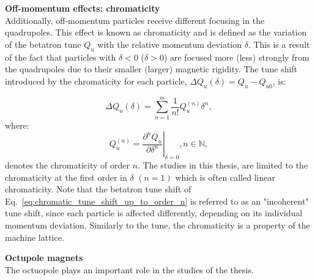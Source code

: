 

\textbf{Off-momentum effects: chromaticity}\\
Additionally, off-momentum particles receive different focusing in the quadrupoles. This effect is known as chromaticity and is defined as the variation of the betatron tune $Q_u$ with the relative momentum deviation $\delta$. This is a result of the fact that particles with $\delta < 0$ ($\delta > 0$) are focused more (less) strongly from the quadrupoles due to their smaller (larger) magnetic rigidity. The tune shift introduced by the chromaticity for each particle, $ \Delta Q_u (\delta)= Q_u - Q_{u0}$, is: %


\begin{equation}\label{eq:chromatic_tune_shift_up_to_order_n}
   \Delta Q_u (\delta) = \sum_{n=1}^m \frac{1}{n!} Q_u^{(n)} \delta^n, 
\end{equation}
where:
\begin{equation}\label{eq:chroma_up_to_order_m}
    Q_u^{(n)} = \left. \frac{\partial ^n Q_u}{\partial \delta^n} \right|_{\delta=0}, n \in \mathbb{N},
 \end{equation}
denotes the chromaticity of order $n$. The studies in this thesis, are limited to the chromaticity at the first order in $\delta$ $(n=1)$ which is often called linear chromaticity. Note that the betatron tune shift of Eq.~\eqref{eq:chromatic_tune_shift_up_to_order_n} is referred to as an "incoherent" tune shift, since each particle is affected differently, depending on its individual momentum deviation. Similarly to the tune, the chromaticity is a property of the machine lattice. %



\textbf{Octupole magnets}\\
The octuopole plays an important role in the studies of the thesis.

